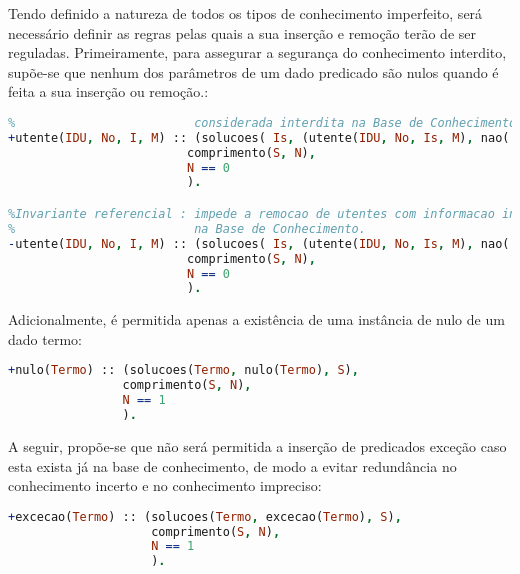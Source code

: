 \documentclass[a4paper]{article}
\begin{document}
\par Tendo definido a natureza de todos os tipos de conhecimento imperfeito, será necessário definir as regras pelas quais a sua inserção e remoção terão de ser reguladas. Primeiramente, para assegurar a segurança do conhecimento interdito, supõe-se que nenhum dos parâmetros de um dado predicado são nulos quando é feita a sua inserção ou remoção.:

\begin{lstlisting}[language=Prolog, caption=É permitida apenas uma instância de um parâmetro para o qual nulo(parâmetro) seja verdadeiro na base de conhecimento.]
% Invariante referencial: impede a insercao de utentes com informacao 
% 			  			  considerada interdita na Base de Conhecimento
+utente(IDU, No, I, M) :: (solucoes( Is, (utente(IDU, No, Is, M), nao( nulo( Is ) ) ), S),
                         comprimento(S, N),
                         N == 0
                         ).

%Invariante referencial : impede a remocao de utentes com informacao intedita
%		  	   			  na Base de Conhecimento.
-utente(IDU, No, I, M) :: (solucoes( Is, (utente(IDU, No, Is, M), nao( nulo( Is ) ) ), S),
                         comprimento(S, N),
                         N == 0
                         ).
\end{lstlisting}

Adicionalmente, é permitida apenas a existência de uma instância de nulo de um dado termo:

\begin{lstlisting}[language=Prolog, caption=Invariante estrutural : Não permitir a inserção de duplicados de predicados nulo. ]
+nulo(Termo) :: (solucoes(Termo, nulo(Termo), S),
                comprimento(S, N),
                N == 1
                ).
\end{lstlisting}

\par A seguir, propõe-se que não será permitida a inserção de predicados exceção caso esta exista já na base de conhecimento, de modo a evitar redundância no conhecimento incerto e no conhecimento impreciso:

\begin{lstlisting}[language=Prolog, caption=Invariante estrutural : Não permitir a inserção de duplicados do predicado excecao. ]
+excecao(Termo) :: (solucoes(Termo, excecao(Termo), S),
                    comprimento(S, N),
                    N == 1
                    ).
\end{lstlisting}
\end{document}
